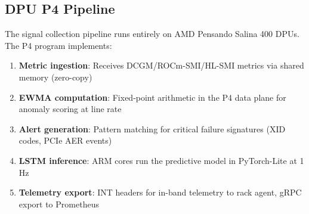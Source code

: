 \documentclass[conference,10pt,letterpaper]{IEEEtran}
\begin{document}
\begin{table}[!t]
\caption{Software Components}
\label{tab:software}
\centering\scriptsize
{}
\end{table}

\subsection{DPU P4 Pipeline}

The signal collection pipeline runs entirely on AMD Pensando Salina 400 DPUs. The P4 program implements:

\begin{enumerate}
\item \textbf{Metric ingestion}: Receives DCGM/ROCm-SMI/HL-SMI metrics via shared memory (zero-copy)
\item \textbf{EWMA computation}: Fixed-point arithmetic in the P4 data plane for anomaly scoring at line rate
\item \textbf{Alert generation}: Pattern matching for critical failure signatures (XID codes, PCIe AER events)
\item \textbf{LSTM inference}: ARM cores run the predictive model in PyTorch-Lite at 1\,Hz
\item \textbf{Telemetry export}: INT headers for in-band telemetry to rack agent, gRPC export to Prometheus
\end{enumerate}
\end{document}
